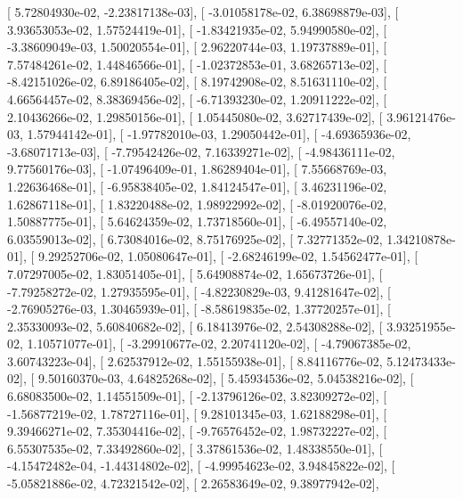 \documentclass{article}
\begin{document}
       [  5.72804930e-02,  -2.23817138e-03],
       [ -3.01058178e-02,   6.38698879e-03],
       [  3.93653053e-02,   1.57524419e-01],
       [ -1.83421935e-02,   5.94990580e-02],
       [ -3.38609049e-03,   1.50020554e-01],
       [  2.96220744e-03,   1.19737889e-01],
       [  7.57484261e-02,   1.44846566e-01],
       [ -1.02372853e-01,   3.68265713e-02],
       [ -8.42151026e-02,   6.89186405e-02],
       [  8.19742908e-02,   8.51631110e-02],
       [  4.66564457e-02,   8.38369456e-02],
       [ -6.71393230e-02,   1.20911222e-02],
       [  2.10436266e-02,   1.29850156e-01],
       [  1.05445080e-02,   3.62717439e-02],
       [  3.96121476e-03,   1.57944142e-01],
       [ -1.97782010e-03,   1.29050442e-01],
       [ -4.69365936e-02,  -3.68071713e-03],
       [ -7.79542426e-02,   7.16339271e-02],
       [ -4.98436111e-02,   9.77560176e-03],
       [ -1.07496409e-01,   1.86289404e-01],
       [  7.55668769e-03,   1.22636468e-01],
       [ -6.95838405e-02,   1.84124547e-01],
       [  3.46231196e-02,   1.62867118e-01],
       [  1.83220488e-02,   1.98922992e-02],
       [ -8.01920076e-02,   1.50887775e-01],
       [  5.64624359e-02,   1.73718560e-01],
       [ -6.49557140e-02,   6.03559013e-02],
       [  6.73084016e-02,   8.75176925e-02],
       [  7.32771352e-02,   1.34210878e-01],
       [  9.29252706e-02,   1.05080647e-01],
       [ -2.68246199e-02,   1.54562477e-01],
       [  7.07297005e-02,   1.83051405e-01],
       [  5.64908874e-02,   1.65673726e-01],
       [ -7.79258272e-02,   1.27935595e-01],
       [ -4.82230829e-03,   9.41281647e-02],
       [ -2.76905276e-03,   1.30465939e-01],
       [ -8.58619835e-02,   1.37720257e-01],
       [  2.35330093e-02,   5.60840682e-02],
       [  6.18413976e-02,   2.54308288e-02],
       [  3.93251955e-02,   1.10571077e-01],
       [ -3.29910677e-02,   2.20741120e-02],
       [ -4.79067385e-02,   3.60743223e-04],
       [  2.62537912e-02,   1.55155938e-01],
       [  8.84116776e-02,   5.12473433e-02],
       [  9.50160370e-03,   4.64825268e-02],
       [  5.45934536e-02,   5.04538216e-02],
       [  6.68083500e-02,   1.14551509e-01],
       [ -2.13796126e-02,   3.82309272e-02],
       [ -1.56877219e-02,   1.78727116e-01],
       [  9.28101345e-03,   1.62188298e-01],
       [  9.39466271e-02,   7.35304416e-02],
       [ -9.76576452e-02,   1.98732227e-02],
       [  6.55307535e-02,   7.33492860e-02],
       [  3.37861536e-02,   1.48338550e-01],
       [ -4.15472482e-04,  -1.44314802e-02],
       [ -4.99954623e-02,   3.94845822e-02],
       [ -5.05821886e-02,   4.72321542e-02],
       [  2.26583649e-02,   9.38977942e-02],
\end{document}
